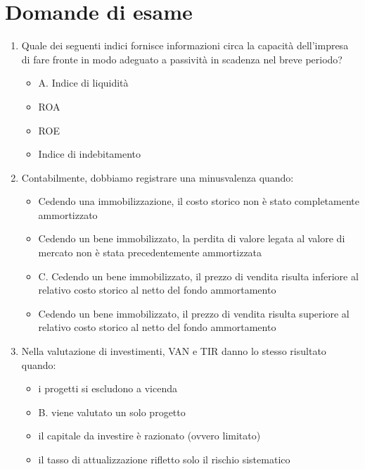 \documentclass{article}
\begin{document}
\section{Domande di esame}
\begin{enumerate}
    \item Quale dei seguenti indici fornisce informazioni circa la capacità dell'impresa di fare fronte in modo adeguato a passività in scadenza nel breve periodo?
          \begin{itemize}
              \item[\checkmark] A. Indice di liquidità
              \item[\sout{B.}] ROA
              \item[\sout{C.}] ROE
              \item[\sout{D.}] Indice di indebitamento
          \end{itemize}

    \item Contabilmente, dobbiamo registrare una minusvalenza quando:
          \begin{itemize}
              \item[\sout{A.}] Cedendo una immobilizzazione, il costo storico non è stato completamente ammortizzato
              \item[\sout{B.}] Cedendo un bene immobilizzato, la perdita di valore legata al valore di mercato non è stata precedentemente ammortizzata
              \item[\checkmark] C. Cedendo un bene immobilizzato, il prezzo di vendita risulta inferiore al relativo costo storico al netto del fondo ammortamento
              \item[\sout{D.}] Cedendo un bene immobilizzato, il prezzo di vendita risulta superiore al relativo costo storico al netto del fondo ammortamento
          \end{itemize}

    \item Nella valutazione di investimenti, VAN e TIR danno lo stesso risultato quando:
          \begin{itemize}
              \item[\sout{A.}] i progetti si escludono a vicenda
              \item[\checkmark] B. viene valutato un solo progetto
              \item[\sout{C.}] il capitale da investire è razionato (ovvero limitato)
              \item[\sout{D.}] il tasso di attualizzazione rifletto solo il rischio sistematico
          \end{itemize}


\end{enumerate}
\end{document}
